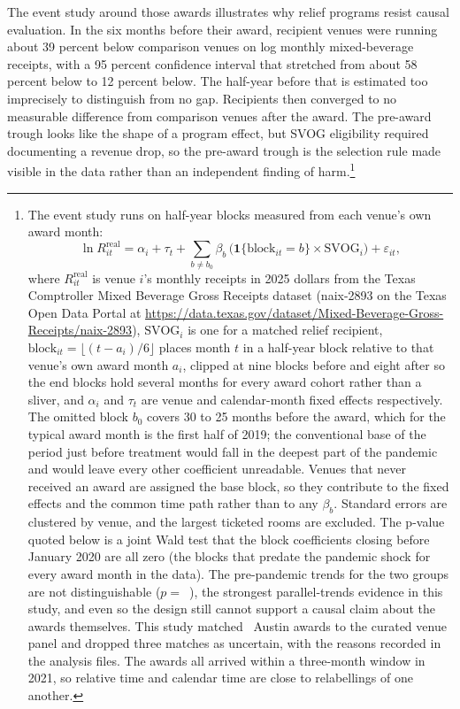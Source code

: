 The event study around those awards illustrates why relief programs resist
causal evaluation. In the six months before their award, recipient venues
were running about 39 percent below comparison venues on log monthly
mixed-beverage receipts, with a 95 percent confidence interval that stretched
from about 58 percent below to 12 percent below. The half-year before that is
estimated too imprecisely to distinguish from no gap. Recipients then
converged to no measurable difference from comparison venues after the award.
The pre-award trough looks like the shape of a program effect, but SVOG
eligibility required documenting a revenue drop, so the pre-award trough is
the selection rule made visible in the data rather than an independent
finding of harm.\footnote{The event study runs on half-year blocks measured
from each venue's own award month:
\[
\ln R^{\mathrm{real}}_{it}
  = \alpha_i + \tau_t
  + \sum_{b \neq b_0} \beta_b\,
    \bigl(\mathbf{1}\{\mathrm{block}_{it} = b\} \times \mathrm{SVOG}_i\bigr)
  + \varepsilon_{it},
\]
where \(R^{\mathrm{real}}_{it}\) is venue \(i\)'s monthly receipts in 2025
dollars from the Texas Comptroller Mixed Beverage Gross Receipts dataset
(naix-2893 on the Texas Open Data Portal at
\url{https://data.texas.gov/dataset/Mixed-Beverage-Gross-Receipts/naix-2893}),
\(\mathrm{SVOG}_i\) is one for a matched relief recipient,
\(\mathrm{block}_{it} = \lfloor (t - a_i)/6 \rfloor\) places month \(t\) in a
half-year block relative to that venue's own award month \(a_i\), clipped at
nine blocks before and eight after so the end blocks hold several months for
every award cohort rather than a sliver, and \(\alpha_i\) and \(\tau_t\) are
venue and calendar-month fixed effects respectively. The omitted block
\(b_0\) covers 30 to 25 months before the award, which for the typical award
month is the first half of 2019; the conventional base of the period just
before treatment would fall in the deepest part of the pandemic and would
leave every other coefficient unreadable. Venues that never received an
award are assigned the base block, so they contribute to the fixed effects
and the common time path rather than to any \(\beta_b\). Standard errors are
clustered by venue, and the largest ticketed rooms are excluded. The
p-value quoted below is a joint Wald test that the block coefficients
closing before January 2020 are all zero (the blocks that predate the
pandemic shock for every award month in the data). The pre-pandemic trends
for the two groups are not distinguishable
(\(p = \)~\NQuasiSvogPretrendPPrepandemic), the strongest parallel-trends
evidence in this study, and even so the design still cannot support a causal
claim about the awards themselves. This study matched
\NQuasiSvogMatchedVenues\ Austin awards to the curated venue panel and
dropped three matches as uncertain, with the reasons recorded in the
analysis files. The awards all arrived within a three-month window in
2021, so relative time and calendar time are close to relabellings of one
another.}

